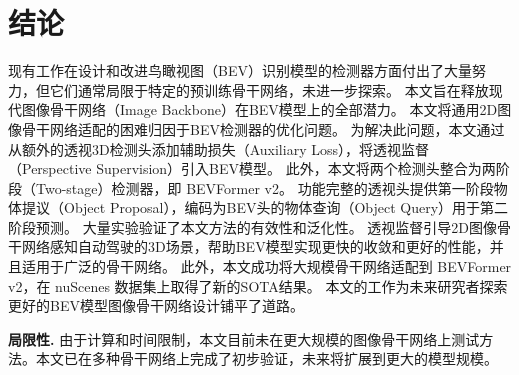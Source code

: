 \section{结论}
现有工作在设计和改进鸟瞰视图（BEV）识别模型的检测器方面付出了大量努力，但它们通常局限于特定的预训练骨干网络，未进一步探索。
本文旨在释放现代图像骨干网络（Image Backbone）在BEV模型上的全部潜力。
本文将通用2D图像骨干网络适配的困难归因于BEV检测器的优化问题。
为解决此问题，本文通过从额外的透视3D检测头添加辅助损失（Auxiliary Loss），将透视监督（Perspective Supervision）引入BEV模型。
此外，本文将两个检测头整合为两阶段（Two-stage）检测器，即 BEVFormer v2。
功能完整的透视头提供第一阶段物体提议（Object Proposal），编码为BEV头的物体查询（Object Query）用于第二阶段预测。
大量实验验证了本文方法的有效性和泛化性。
透视监督引导2D图像骨干网络感知自动驾驶的3D场景，帮助BEV模型实现更快的收敛和更好的性能，并且适用于广泛的骨干网络。
此外，本文成功将大规模骨干网络适配到 BEVFormer v2，在 nuScenes 数据集上取得了新的SOTA结果。
本文的工作为未来研究者探索更好的BEV模型图像骨干网络设计铺平了道路。

\noindent\textbf{局限性.} 由于计算和时间限制，本文目前未在更大规模的图像骨干网络上测试方法。本文已在多种骨干网络上完成了初步验证，未来将扩展到更大的模型规模。
